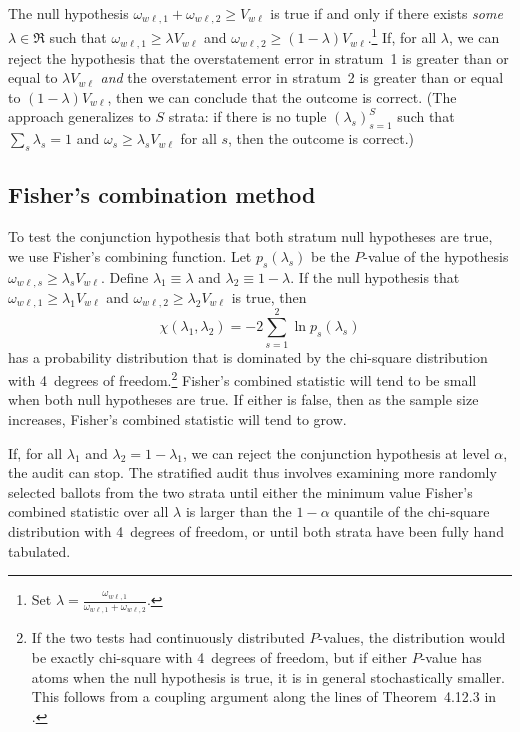 \documentclass[runningheads]{llncs}
\newcommand{\beq}{\begin{equation}}
\newcommand{\eeq}{\end{equation}}
\begin{document}
The null hypothesis $\omega_{w\ell, 1} + \omega_{w\ell, 2} \ge V_{w\ell}$ is true if and only if there exists \textit{some} $\lambda \in \Re$ such that 
$\omega_{w\ell, 1}\ge \lambda V_{w\ell}$ and 
$\omega_{w\ell, 2}\ge (1-\lambda) V_{w\ell}$.\footnote{%
  Set $\lambda = \frac{\omega_{w\ell, 1}}{\omega_{w\ell, 1}+\omega_{w\ell, 2}}$.
}
If, for all $\lambda$, we can reject the hypothesis that the 
overstatement error in stratum~1 is greater than or equal to $\lambda V_{w\ell}$ \emph{and} 
the overstatement error in stratum~2 is greater than or equal to $(1-\lambda) V_{w\ell}$, then
we can conclude that the outcome is correct.
(The approach generalizes to $S$ strata: if there is no tuple $( \lambda_s )_{s=1}^S$ such that
$\sum_s \lambda_s = 1$ and $\omega_s \ge \lambda_s V_{w\ell}$ for all $s$, then
the outcome is correct.)

\subsection{Fisher's combination method}

To test the conjunction hypothesis that both stratum null hypotheses are true, we use 
Fisher's combining function.
Let $p_s(\lambda_s)$ be the $P$-value of the hypothesis $\omega_{w\ell,s} \ge \lambda_s V_{w\ell}$.
Define $\lambda_1 \equiv \lambda$ and $\lambda_2 \equiv 1-\lambda$.
If the null hypothesis that $\omega_{w\ell,1} \ge \lambda_1 V_{w\ell}$ and 
$\omega_{w\ell,2} \ge \lambda_2 V_{w\ell}$ is true, then 
\beq \label{eq:fisher}
   \chi(\lambda_1, \lambda_2) = -2 \sum_{s=1}^2 \ln p_s(\lambda_s)
\eeq
has a probability distribution that is dominated by the chi-square distribution with 4~degrees
of freedom.\footnote{%
   If the two tests had continuously distributed $P$-values, the distribution would be exactly
   chi-square with 4~degrees of freedom, but if either $P$-value has atoms when
   the null hypothesis is true, it is in general stochastically smaller.
   This follows from a coupling argument along the lines of Theorem~4.12.3 in \cite{grimmett01}.
}
Fisher's combined statistic will tend to be small when both null hypotheses are true.
If either is false, then as the sample size increases, Fisher's combined statistic will tend to grow.

If, for all $\lambda_1$ and $\lambda_2 = 1- \lambda_1$, we can reject the conjunction
hypothesis at level $\alpha$, the audit can stop.
The stratified audit thus involves examining more randomly selected ballots from the two strata until 
either the minimum value Fisher's combined statistic over all $\lambda$ 
is larger than the $1-\alpha$ quantile of the chi-square
distribution with 4~degrees of freedom, or until both strata have been fully hand tabulated.
\end{document}
